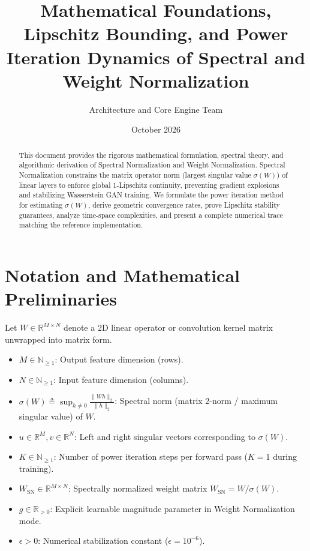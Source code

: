 \documentclass[11pt,a4paper]{article}
\title{\textbf{Mathematical Foundations, Lipschitz Bounding, and Power Iteration Dynamics of Spectral and Weight Normalization}}
\author{Architecture and Core Engine Team}
\date{October 2026}
\theoremstyle{definition}
\begin{document}
\maketitle

\begin{abstract}
This document provides the rigorous mathematical formulation, spectral theory, and algorithmic derivation of Spectral Normalization and Weight Normalization. Spectral Normalization constrains the matrix operator norm (largest singular value $\sigma(W)$) of linear layers to enforce global 1-Lipschitz continuity, preventing gradient explosions and stabilizing Wasserstein GAN training. We formulate the power iteration method for estimating $\sigma(W)$, derive geometric convergence rates, prove Lipschitz stability guarantees, analyze time-space complexities, and present a complete numerical trace matching the reference implementation.
\end{abstract}

\section{Notation and Mathematical Preliminaries}

Let $W \in \mathbb{R}^{M \times N}$ denote a 2D linear operator or convolution kernel matrix unwrapped into matrix form.

\begin{itemize}
    \item $M \in \mathbb{N}_{\ge 1}$: Output feature dimension (rows).
    \item $N \in \mathbb{N}_{\ge 1}$: Input feature dimension (columns).
    \item $\sigma(W) \triangleq \sup_{h \ne 0} \frac{\|W h\|_2}{\|h\|_2}$: Spectral norm (matrix 2-norm / maximum singular value) of $W$.
    \item $u \in \mathbb{R}^M, v \in \mathbb{R}^N$: Left and right singular vectors corresponding to $\sigma(W)$.
    \item $K \in \mathbb{N}_{\ge 1}$: Number of power iteration steps per forward pass ($K = 1$ during training).
    \item $W_{\text{SN}} \in \mathbb{R}^{M \times N}$: Spectrally normalized weight matrix $W_{\text{SN}} = W / \sigma(W)$.
    \item $g \in \mathbb{R}_{> 0}$: Explicit learnable magnitude parameter in Weight Normalization mode.
    \item $\epsilon > 0$: Numerical stabilization constant ($\epsilon = 10^{-6}$).
\end{itemize}
\end{document}
